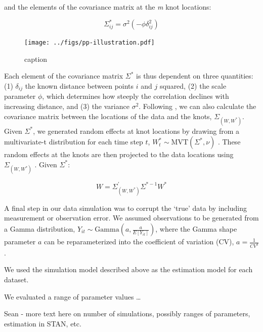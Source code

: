 \documentclass[12pt,english]{article}
\begin{document}
\begin{spacing}{1.05}
and the elements of the covariance matrix at the \emph{m} knot locations:

\begin{equation}
\Sigma_{ij}^*=\sigma^2 \left( -\phi \delta_{ij}^2 \right)
\end{equation}

\begin{figure}[htb]
\begin{center}
  \texttt{[image: ../figs/pp-illustration.pdf]}
\caption{caption}
\label{fig:didactic}
\end{center}
\end{figure}

Each element of the covariance matrix $\Sigma^*$ is thus dependent on
three quantities: (1) $\delta_{ij}$ the known distance between points $i$ and
$j$ squared, (2) the scale parameter $\phi$, which determines how steeply the
correlation declines with increasing distance, and (3) the variance $\sigma^2$.
Following \citep{latimer2009}, we can also calculate the covariance matrix
between the locations of the data and the knots, 
$\Sigma_{\left(W, W^* \right)}$. 
Given $\Sigma^*$, we generated random effects at knot
locations by drawing from a multivariate-t distribution for each time step $t$, 
$W_t^*\sim \mathrm{MVT}\left( \Sigma^{*},\nu \right)$ .
These random effects at the knots are then projected to the data locations using
$\Sigma_{\left( W,W^{*} \right)}$ \citep{latimer2009}.
Given ${\Sigma}^{*}$:

\begin{equation}
W=\Sigma_{\left(W,W^* \right)}^{'} \Sigma^{*-1}W^*
\end{equation}
    
A final step in our data simulation was to corrupt the `true' data by
including measurement or observation error. We assumed observations to be
generated from a Gamma distribution, 
$Y_{it}\sim \mathrm{Gamma}\left(a,\frac {a}{E[Y_{it}]} \right)$, 
where the Gamma shape parameter
$a$ can be reparameterized into the coefficient of variation (CV), 
$a=\frac{1}{CV^2}$.

We used the simulation model described above as the estimation model for each
dataset.

We evaluated a range of parameter values \ldots

Sean - more text here on number of simulations, possibly ranges of
parameters, estimation in STAN, etc.


\end{spacing}
\end{document}
